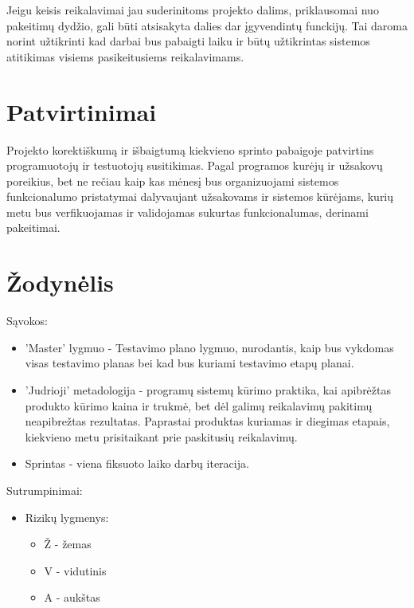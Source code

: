 \documentclass{VUMIFPSkursinis}
\begin{document}
    Jeigu keisis reikalavimai jau suderinitoms projekto dalims, priklausomai nuo pakeitimų dydžio, gali būti atsisakyta dalies dar įgyvendintų funckijų.
     Tai daroma norint užtikrinti kad darbai bus pabaigti laiku ir būtų užtikrintas sistemos atitikimas visiems pasikeitusiems reikalavimams.

    \section{Patvirtinimai}
    Projekto korektiškumą ir išbaigtumą kiekvieno sprinto pabaigoje patvirtins programuotojų ir testuotojų susitikimas. 
    Pagal programos kurėjų ir užsakovų poreikius, bet ne rečiau kaip kas mėnesį bus organizuojami sistemos funkcionalumo pristatymai 
     dalyvaujant užsakovams ir sistemos kūrėjams, kurių metu bus verfikuojamas ir validojamas sukurtas funkcionalumas, derinami pakeitimai.

    \section{Žodynėlis}

    Sąvokos:
    \begin{itemize}
    	\item 'Master' lygmuo - Testavimo plano lygmuo, nurodantis, kaip bus vykdomas visas testavimo planas bei kad bus kuriami testavimo etapų planai.
      \item 'Judrioji' metadologija - programų sistemų kūrimo praktika, kai apibrėžtas produkto kūrimo kaina ir trukmė, bet dėl galimų reikalavimų pakitimų neapibrežtas rezultatas.
       Paprastai produktas kuriamas ir diegimas etapais, kiekvieno metu prisitaikant prie paskitusių reikalavimų.
      \item Sprintas - viena fiksuoto laiko darbų iteracija. 
    \end{itemize}

    Sutrumpinimai:
    \begin{itemize}
    	\item Rizikų lygmenys:
    		\begin{itemize}
    			\item Ž - žemas
    			\item V - vidutinis
    			\item A - aukštas
    		\end{itemize}
    \end{itemize}

  
\end{document}
